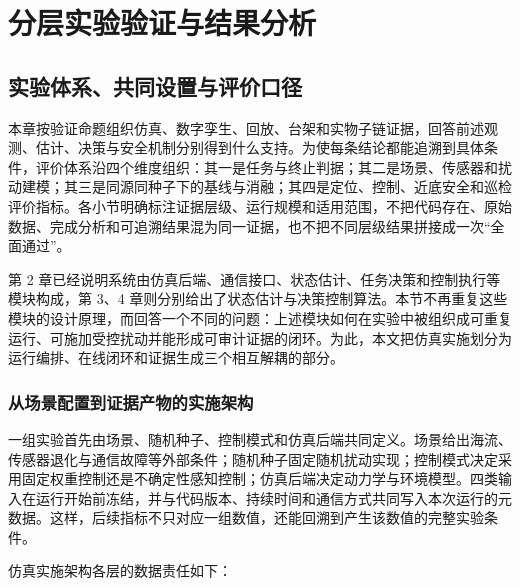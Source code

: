 
\chapter{分层实验验证与结果分析}

\section{实验体系、共同设置与评价口径}\label{sec:ch05-5-1}

本章按验证命题组织仿真、数字孪生、回放、台架和实物子链证据，回答前述观测、估计、决策与安全机制分别得到什么支持。为使每条结论都能追溯到具体条件，评价体系沿四个维度组织：其一是任务与终止判据；其二是场景、传感器和扰动建模；其三是同源同种子下的基线与消融；其四是定位、控制、近底安全和巡检评价指标。各小节明确标注证据层级、运行规模和适用范围，不把代码存在、原始数据、完成分析和可追溯结果混为同一证据，也不把不同层级结果拼接成一次``全面通过''。

第 2 章已经说明系统由仿真后端、通信接口、状态估计、任务决策和控制执行等模块构成，第 3、4 章则分别给出了状态估计与决策控制算法。本节不再重复这些模块的设计原理，而回答一个不同的问题：上述模块如何在实验中被组织成可重复运行、可施加受控扰动并能形成可审计证据的闭环。为此，本文把仿真实施划分为运行编排、在线闭环和证据生成三个相互解耦的部分。

\subsection{从场景配置到证据产物的实施架构}\label{sec:ch05-5-1-1}

一组实验首先由场景、随机种子、控制模式和仿真后端共同定义。场景给出海流、传感器退化与通信故障等外部条件；随机种子固定随机扰动实现；控制模式决定采用固定权重控制还是不确定性感知控制；仿真后端决定动力学与环境模型。四类输入在运行开始前冻结，并与代码版本、持续时间和通信方式共同写入本次运行的元数据。这样，后续指标不只对应一组数值，还能回溯到产生该数值的完整实验条件。

仿真实施架构各层的数据责任如下：

